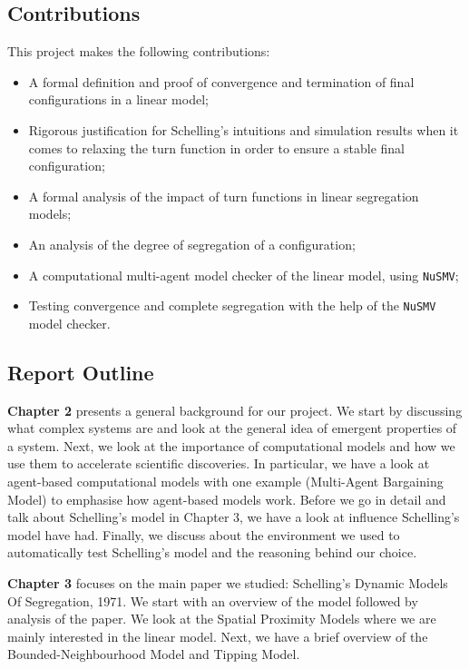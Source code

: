 \documentclass[../main.tex]{subfiles}
\begin{document}
\subsection{Contributions}
This project makes the following contributions:
\begin{itemize}
    \item A formal definition and proof of convergence and termination of final configurations in a linear model;
    \item Rigorous justification for Schelling's intuitions and simulation results when it comes to relaxing the turn function in order to ensure a stable final configuration;
    \item A formal analysis of the impact of turn functions in linear segregation models;
    \item An analysis of the degree of segregation of a configuration;
    \item A computational multi-agent model checker of the linear model, using \verb|NuSMV|;
    \item Testing convergence and complete segregation with the help of the \verb|NuSMV| model checker.
\end{itemize}


\subsection{Report Outline}
\textbf{Chapter 2} presents a general background for our project. We start by discussing what complex systems are and look at the general idea of emergent properties of a system. Next, we look at the importance of computational models and how we use them to accelerate scientific discoveries. In particular, we  have a look at agent-based computational models with one example (Multi-Agent Bargaining Model) to emphasise how agent-based models work. Before we  go in detail and talk about Schelling's model in Chapter 3, we have a look at influence Schelling's model have had. Finally, we  discuss about the environment we used to automatically test Schelling's model and the reasoning behind our choice.

\textbf{Chapter 3} focuses on the main paper we studied: Schelling's Dynamic Models Of Segregation, 1971. We start with an overview of the model followed by analysis of the paper. We look at the Spatial Proximity Models where we are mainly interested in the linear model. Next, we have a brief overview of the Bounded-Neighbourhood Model and Tipping Model.
\end{document}
